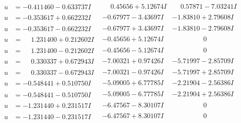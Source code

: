 \documentclass[1p]{elsarticle_modified}
\theoremstyle{definition}
\begin{document}
$$\begin{array}{c|c|c}
\begin{aligned}
u &= -0.411460 - 0.633737 I\end{aligned}
 & \phantom{-}0.45656 + 5.12674 I & \phantom{-}0.57871 - 7.03241 I \\ \hline\begin{aligned}
u &= -0.353617 + 0.662232 I\end{aligned}
 & -0.67977 - 3.43697 I & -1.83810 + 2.79608 I \\ \hline\begin{aligned}
u &= -0.353617 - 0.662232 I\end{aligned}
 & -0.67977 + 3.43697 I & -1.83810 - 2.79608 I \\ \hline\begin{aligned}
u &= \phantom{-}1.231400 + 0.212602 I\end{aligned}
 & -0.45656 + 5.12674 I & \phantom{-0.000000 } 0 \\ \hline\begin{aligned}
u &= \phantom{-}1.231400 - 0.212602 I\end{aligned}
 & -0.45656 - 5.12674 I & \phantom{-0.000000 } 0 \\ \hline\begin{aligned}
u &= \phantom{-}0.330337 + 0.672943 I\end{aligned}
 & -7.00321 + 0.97426 I & -5.71997 - 2.85709 I \\ \hline\begin{aligned}
u &= \phantom{-}0.330337 - 0.672943 I\end{aligned}
 & -7.00321 - 0.97426 I & -5.71997 + 2.85709 I \\ \hline\begin{aligned}
u &= -0.548441 + 0.510750 I\end{aligned}
 & -5.09005 + 6.77785 I & -2.21904 - 2.56386 I \\ \hline\begin{aligned}
u &= -0.548441 - 0.510750 I\end{aligned}
 & -5.09005 - 6.77785 I & -2.21904 + 2.56386 I \\ \hline\begin{aligned}
u &= -1.231440 + 0.231517 I\end{aligned}
 & -6.47567 - 8.30107 I & \phantom{-0.000000 } 0 \\ \hline\begin{aligned}
u &= -1.231440 - 0.231517 I\end{aligned}
 & -6.47567 + 8.30107 I & \phantom{-0.000000 } 0 \\ \hline\begin{aligned}

\end{aligned}
\end{array}$$
\end{document}
